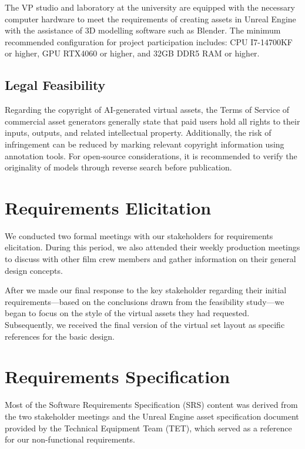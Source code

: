 \documentclass[12pt,a4paper]{report}
\begin{document}
The VP studio and laboratory at the university are equipped with the necessary computer hardware to meet the requirements of creating assets in Unreal Engine with the assistance of 3D modelling software such as Blender. The minimum recommended configuration for project participation includes: CPU I7-14700KF or higher, GPU RTX4060 or higher, and 32GB DDR5 RAM or higher.

\subsection{Legal Feasibility}

Regarding the copyright of AI-generated virtual assets, the Terms of Service of commercial asset generators generally state that paid users hold all rights to their inputs, outputs, and related intellectual property. Additionally, the risk of infringement can be reduced by marking relevant copyright information using annotation tools. For open-source considerations, it is recommended to verify the originality of models through reverse search before publication.

\section{Requirements Elicitation}

We conducted two formal meetings with our stakeholders for requirements elicitation. During this period, we also attended their weekly production meetings to discuss with other film crew members and gather information on their general design concepts.

After we made our final response to the key stakeholder regarding their initial requirements—based on the conclusions drawn from the feasibility study—we began to focus on the style of the virtual assets they had requested. Subsequently, we received the final version of the virtual set layout as specific references for the basic design.

\section{Requirements Specification}

Most of the Software Requirements Specification (SRS) content was derived from the two stakeholder meetings and the Unreal Engine asset specification document provided by the Technical Equipment Team (TET), which served as a reference for our non-functional requirements.
\end{document}
